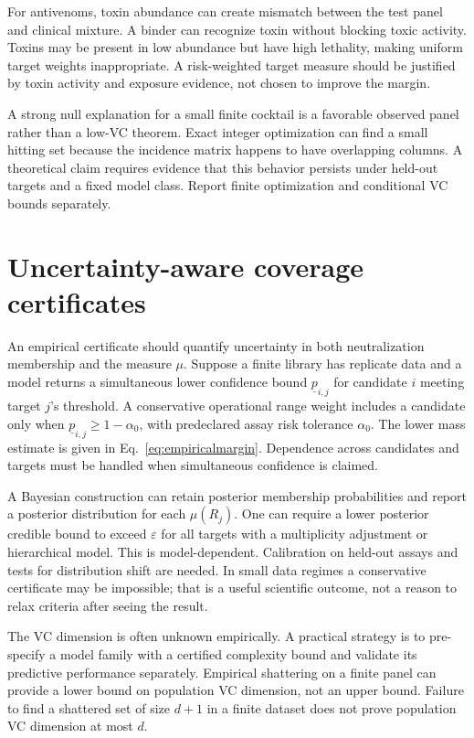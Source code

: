 \documentclass[11pt,a4paper]{article}
\newcommand{\eps}{\varepsilon}
\begin{document}
For antivenoms, toxin abundance can create mismatch between the test panel and clinical mixture. A binder can recognize toxin without blocking toxic activity. Toxins may be present in low abundance but have high lethality, making uniform target weights inappropriate. A risk-weighted target measure should be justified by toxin activity and exposure evidence, not chosen to improve the margin.

A strong null explanation for a small finite cocktail is a favorable observed panel rather than a low-VC theorem. Exact integer optimization can find a small hitting set because the incidence matrix happens to have overlapping columns. A theoretical claim requires evidence that this behavior persists under held-out targets and a fixed model class. Report finite optimization and conditional VC bounds separately.

\section{Uncertainty-aware coverage certificates}
An empirical certificate should quantify uncertainty in both neutralization membership and the measure $\mu$. Suppose a finite library has replicate data and a model returns a simultaneous lower confidence bound $\underline p_{i,j}$ for candidate $i$ meeting target $j$'s threshold. A conservative operational range weight includes a candidate only when $\underline p_{i,j}\geq1-\alpha_0$, with predeclared assay risk tolerance $\alpha_0$. The lower mass estimate is given in Eq.~\eqref{eq:empiricalmargin}. Dependence across candidates and targets must be handled when simultaneous confidence is claimed.

A Bayesian construction can retain posterior membership probabilities and report a posterior distribution for each $\mu(R_j)$. One can require a lower posterior credible bound to exceed $\eps$ for all targets with a multiplicity adjustment or hierarchical model. This is model-dependent. Calibration on held-out assays and tests for distribution shift are needed. In small data regimes a conservative certificate may be impossible; that is a useful scientific outcome, not a reason to relax criteria after seeing the result.

The VC dimension is often unknown empirically. A practical strategy is to pre-specify a model family with a certified complexity bound and validate its predictive performance separately. Empirical shattering on a finite panel can provide a lower bound on population VC dimension, not an upper bound. Failure to find a shattered set of size $d+1$ in a finite dataset does not prove population VC dimension at most $d$.
\end{document}
